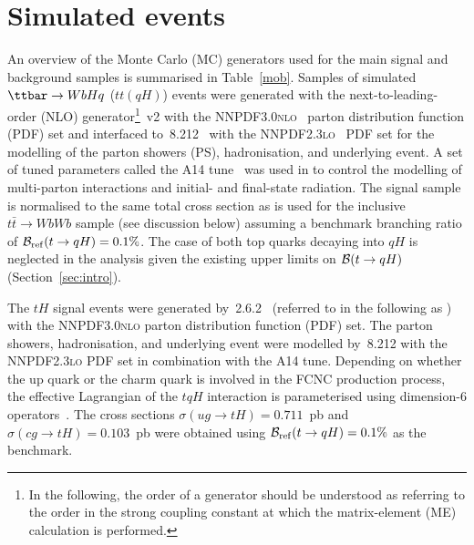 \section{Simulated events}
\label{sec:simulations}

An overview of the Monte Carlo (MC) generators used for the main signal and background samples is summarised in Table~\ref{mob}.
Samples of simulated $\ttbar \to WbHq$ ($tt(qH)$) events were generated with the next-to-leading-order (NLO) generator\footnote{In the following, 
the order of a generator should be understood as referring to the order in the strong coupling constant at which the matrix-element (ME) calculation 
is performed.} {\powheg}\,v2 \cite{Frixione:2007nw,Nason:2004rx,Frixione:2007vw,Alioli:2010xd}
with the \textsc{NNPDF3.0nlo}~\cite{Ball:2014uwa} parton distribution function (PDF) set and interfaced to {\pythia}\,8.212~\cite{Sjostrand:2007gs} with the \textsc{NNPDF2.3lo}~\cite{Ball:2012cx} PDF set for the modelling of the parton showers (PS), hadronisation, and underlying event. 
A set of tuned parameters called the A14 tune~\cite{ATLASUETune4} was used in {\pythia} to control the modelling of multi-parton interactions and  
initial- and final-state radiation.
The signal sample is normalised to the same total cross section as is used for the inclusive $t\bar{t}\to WbWb$ sample (see discussion below)
assuming a benchmark branching ratio of $\mathcal{B}_{\mathrm{ref}}(t\to qH)=0.1\%$.
The case of both top quarks decaying into $qH$ is neglected in the analysis given the existing upper limits on $\mathcal{B}(t \to qH)$ (Section~\ref{sec:intro}).

The $tH$ signal events were generated by {\amcatnlolong}\,2.6.2~\cite{Alwall:2014hca}  (referred to in the following as {\amcatnlo})
with the \textsc{NNPDF3.0nlo} parton distribution function (PDF) set. The parton showers, hadronisation, and underlying event were modelled by {\pythia}\,8.212 with the \textsc{NNPDF2.3lo} PDF set
in combination with the A14 tune.
Depending on whether the up quark or the charm quark is involved in the FCNC production process, the effective Lagrangian of the $tqH$ interaction is parameterised using
dimension-6 operators~\cite{fcnc_production_theory}. The cross sections $\sigma(ug\to tH) = 0.711$~pb and $\sigma(cg\to tH) = 0.103$~pb were obtained using $\mathcal{B}_{\mathrm{ref}}(t\to qH)=0.1\%$ as the benchmark.   


